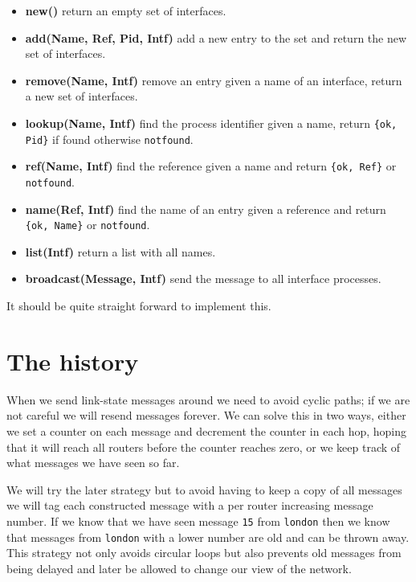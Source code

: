 \documentclass[a4paper, 11pt]{article}
\begin{document}
\begin{itemize}
\item {\bf new()} return an empty set of interfaces.

\item {\bf add(Name, Ref, Pid, Intf)} add a new entry to the set and
return the new set of interfaces.

\item  {\bf remove(Name, Intf)} remove an entry given a name of an interface,
return a new set of interfaces.

\item  {\bf lookup(Name, Intf)} find the process identifier given a name,
return {\tt \{ok, Pid\}} if found otherwise {\tt notfound}.

\item  {\bf ref(Name, Intf)} find the reference given a name and return {\tt \{ok, Ref\}} or {\tt notfound}.

\item  {\bf name(Ref, Intf)} find the name of an entry given a reference and
return {\tt \{ok, Name\}} or {\tt notfound}.

\item  {\bf list(Intf)} return a list with all names.

\item  {\bf broadcast(Message, Intf)} send the message to all interface processes.
\end{itemize}

\noindent It should be quite straight forward to implement this. 

\section{The history}

When we send link-state messages around we need to avoid cyclic
paths; if we are not careful we will resend messages forever. We can
solve this in two ways, either we set a counter on each message and
decrement the counter in each hop, hoping that it will reach all
routers before the counter reaches zero, or we keep track of what
messages we have seen so far.

We will try the later strategy but to avoid having to keep a copy of
all messages we will tag each constructed message with a per router increasing
message number. If we know that we have seen message {\tt 15} from
{\tt london} then we know that messages from {\tt london} with a lower
number are old and can be thrown away. This strategy not only avoids
circular loops but also prevents old messages from being delayed and
later be allowed to change our view of the network. 
\end{document}
